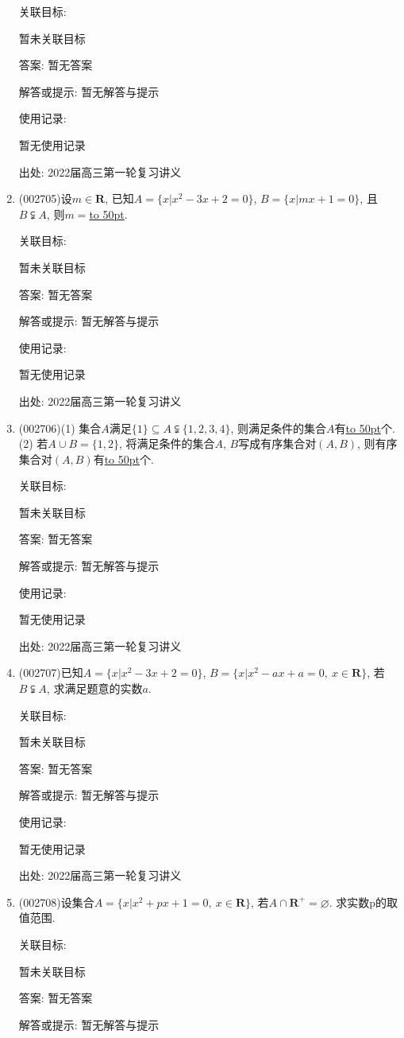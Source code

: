 \documentclass[10pt,a4paper]{article}
\newcommand{\blank}[1]{\underline{\hbox to #1pt{}}}
\begin{document}
\begin{enumerate}[1.]
关联目标:

暂未关联目标

答案: 暂无答案

解答或提示: 暂无解答与提示

使用记录:

暂无使用记录


出处: 2022届高三第一轮复习讲义
\item { (002705)}设$m\in \mathbf{R}$, 已知$A=\{x|x^2-3x+2=0\}$, $B=\{x|mx+1=0\}$, 且$B\subsetneqq A$, 则$m=$\blank{50}.


关联目标:

暂未关联目标

答案: 暂无答案

解答或提示: 暂无解答与提示

使用记录:

暂无使用记录


出处: 2022届高三第一轮复习讲义
\item { (002706)}(1) 集合$A$满足$\{1\}\subseteq A \subsetneqq \{1,2,3,4\}$, 则满足条件的集合$A$有\blank{50}个.
(2) 若$A\cup B=\{1,2\}$, 将满足条件的集合$A$, $B$写成有序集合对$(A,B)$, 则有序集合对$(A,B)$有\blank{50}个.


关联目标:

暂未关联目标

答案: 暂无答案

解答或提示: 暂无解答与提示

使用记录:

暂无使用记录


出处: 2022届高三第一轮复习讲义
\item { (002707)}已知$A=\{x|x^2-3x+2=0\}$, $B=\{x|x^2-ax+a=0, \ x\in \mathbf{R}\}$, 若$B\subsetneqq A$, 求满足题意的实数$a$.


关联目标:

暂未关联目标

答案: 暂无答案

解答或提示: 暂无解答与提示

使用记录:

暂无使用记录


出处: 2022届高三第一轮复习讲义
\item { (002708)}设集合$A=\{x|x^2+px+1=0,\ x\in \mathbf{R}\}$, 若$A\cap \mathbf{R}^+=\varnothing$. 求实数p的取值范围.


关联目标:

暂未关联目标

答案: 暂无答案

解答或提示: 暂无解答与提示


\end{enumerate}
\end{document}
